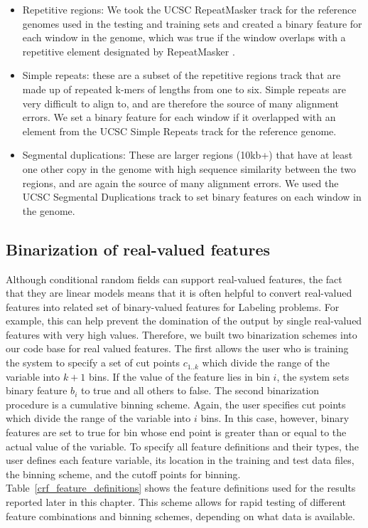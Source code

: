 \begin{itemize}
\item Repetitive regions: We took the UCSC RepeatMasker track for the reference genomes used in the testing and training sets and created a binary feature for each window in the genome, which was true if the window overlaps with a repetitive element designated by RepeatMasker \cite{repeatmasker}.

\item Simple repeats: these are a subset of the repetitive regions track that are made up of repeated k-mers of lengths from one to six. Simple repeats are very difficult to align to, and are therefore the source of many alignment errors. We set a binary feature for each window if it overlapped with an element from the UCSC Simple Repeats track \cite{Benson01011999} for the reference genome.

\item Segmental duplications: These are larger regions (10kb+) that have at least one other copy in the genome with high sequence similarity between the two regions, and are again the source of many alignment errors. We used the UCSC Segmental Duplications track to set binary features on each window in the genome.

\end{itemize}

\subsection{Binarization of real-valued features}

Although conditional random fields can support real-valued features, the fact that they are linear models means that it is often helpful to convert real-valued features into related set of binary-valued features for Labeling problems. For example, this can help prevent the domination of the output by single real-valued features with very high values. Therefore, we built two binarization schemes into our code base for real valued features. The first allows the user who is training the system to specify a set of cut points $c_{1..k}$ which divide the range of the variable into $k + 1$ bins. If the value of the feature lies in bin $i$, the system sets binary feature $b_i$ to true and all others to false. The second binarization procedure is a cumulative binning scheme. Again, the user specifies cut points which divide the range of the variable into $i$ bins. In this case, however, binary features are set to true for bin whose end point is greater than or equal to the actual value of the variable. To specify all feature definitions and their types, the user defines each feature variable, its location in the training and test data files, the binning scheme, and the cutoff points for binning. Table~\ref{crf_feature_definitions} shows the feature definitions used for the results reported later in this chapter. This scheme allows for rapid testing of different feature combinations and binning schemes, depending on what data is available.

